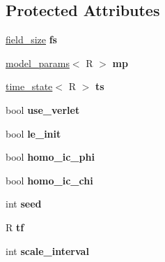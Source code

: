 \subsection*{Protected Attributes}
\begin{DoxyCompactItemize}
\item 
\hypertarget{classmodel_a40d2f23dcbec53f421dfa25ecc57030e}{
\hyperlink{structfield__size}{field\_\-size} {\bfseries fs}}
\label{classmodel_a40d2f23dcbec53f421dfa25ecc57030e}

\item 
\hypertarget{classmodel_aa239be849b91caa21352765567ef584a}{
\hyperlink{structmodel__params}{model\_\-params}$<$ R $>$ {\bfseries mp}}
\label{classmodel_aa239be849b91caa21352765567ef584a}

\item 
\hypertarget{classmodel_a7147930cb35a8f2aa47c4cfdc6d39c36}{
\hyperlink{structtime__state}{time\_\-state}$<$ R $>$ {\bfseries ts}}
\label{classmodel_a7147930cb35a8f2aa47c4cfdc6d39c36}

\item 
\hypertarget{classmodel_a9854a29ea87651d1ded6ca6c8790eb9b}{
bool {\bfseries use\_\-verlet}}
\label{classmodel_a9854a29ea87651d1ded6ca6c8790eb9b}

\item 
\hypertarget{classmodel_a3c6584aee08a90b08d8a5cc7d90e3a66}{
bool {\bfseries le\_\-init}}
\label{classmodel_a3c6584aee08a90b08d8a5cc7d90e3a66}

\item 
\hypertarget{classmodel_a92b75cf1df91519d2bf5a0659ad0d3b5}{
bool {\bfseries homo\_\-ic\_\-phi}}
\label{classmodel_a92b75cf1df91519d2bf5a0659ad0d3b5}

\item 
\hypertarget{classmodel_aeabac8cb1644e33a1d5db116debdf527}{
bool {\bfseries homo\_\-ic\_\-chi}}
\label{classmodel_aeabac8cb1644e33a1d5db116debdf527}

\item 
\hypertarget{classmodel_a111ad89eea9df0a5f40d30241f5884fa}{
int {\bfseries seed}}
\label{classmodel_a111ad89eea9df0a5f40d30241f5884fa}

\item 
\hypertarget{classmodel_a036cddd403fb7afcfaa62d909bba1a1b}{
R {\bfseries tf}}
\label{classmodel_a036cddd403fb7afcfaa62d909bba1a1b}

\item 
\hypertarget{classmodel_adaf2c0ea292512a3b0ad7b3eded33a38}{
int {\bfseries scale\_\-interval}}
\label{classmodel_adaf2c0ea292512a3b0ad7b3eded33a38}


\end{DoxyCompactItemize}
